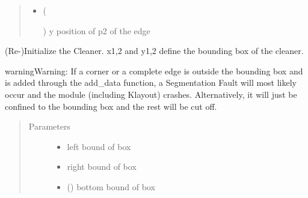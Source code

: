 \documentclass[a4paper,10pt,english]{sphinxmanual}
\begin{document}
\begin{fulllineitems}
\begin{fulllineitems}
\begin{quote}
\begin{description}
\begin{itemize}
\item {} 
 (%
\begin{footnote}[9]\sphinxAtStartFootnote
{}
%
\end{footnote}) \textendash{} y position of p2 of the edge

\end{itemize}

\end{description}\end{quote}

\end{fulllineitems}


\begin{fulllineitems}
\label{\detokenize{drc:kppc.drc.kppc.drc.slcleaner.PyDrcSl.init_list}}
(Re-)Initialize the Cleaner. x1,2 and y1,2 define the bounding box of the cleaner.

\begin{sphinxadmonition}{warning}{Warning:}
If a corner or a complete edge is outside the bounding box and is added through the add\_data function, a Segmentation Fault will most likely occur and the module (including Klayout) crashes. Alternatively, it will just be confined to the bounding box and the rest will be cut off.
\end{sphinxadmonition}
\begin{quote}\begin{description}
\item[{Parameters}] \leavevmode\begin{itemize}
\item {} 
 \textendash{} left bound of box

\item {} 
 \textendash{} right bound of box

\item {} 
 () \textendash{} bottom bound of box


\end{itemize}
\end{description}
\end{quote}
\end{fulllineitems}
\end{fulllineitems}
\end{document}
